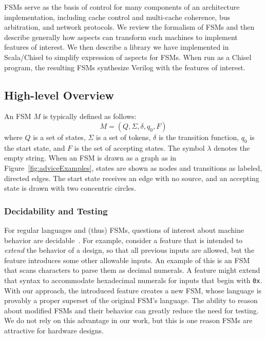 \documentclass[conference]{IEEEtran}
\begin{document}
FSMs serve as the basis of control for many components of an architecture implementation, including cache control and multi-cache coherence, bus arbitration, and network protocols.  We review the formalism of FSMs and then describe generally how aspects can transform such machines to implement features of interest.  We then describe a library we have implemented in Scala/Chisel to simplify expression of aspects for FSMs.  When run as a Chisel program, the resulting FSMs synthesize Verilog with the features of interest.

\subsection{High-level Overview}
An FSM $M$ is typically defined as follows: 
\[M = (Q, \Sigma, \delta, q_0, F)\]where $Q$ is a set of states, $\Sigma$ is a set of tokens, $\delta$ is the transition function, $q_0$ is the start state, and $F$ is the set of accepting states. The symbol $\lambda$ denotes the empty string.  When an FSM is drawn as a graph as in Figure~\ref{fig:adviceExamples}, states are shown as nodes and transitions as labeled, directed edges. The start state receives an edge with no source, and an accepting state is drawn with two concentric circles. 

\subsubsection{Decidability and Testing}
For regular languages and (thus) FSMs, questions of interest about machine behavior are decidable~\cite{sipser}. For example, consider a feature that is intended to \emph{extend} the behavior of a design, so that all previous inputs are allowed, but the feature introduces some other allowable inputs.
An example of this is an FSM that scans characters to parse them as decimal numerals.  A feature might extend that syntax to accommodate hexadecimal numerals for inputs that begin with \texttt{0x}. With our approach, the introduced feature creates a new FSM, whose language is provably a proper superset of the original FSM's language.  
The ability to reason about modified FSMs and their behavior can greatly reduce the need for testing.  We do not rely on this advantage in our work, but this is one reason FSMs are attractive for hardware designs.
\end{document}
